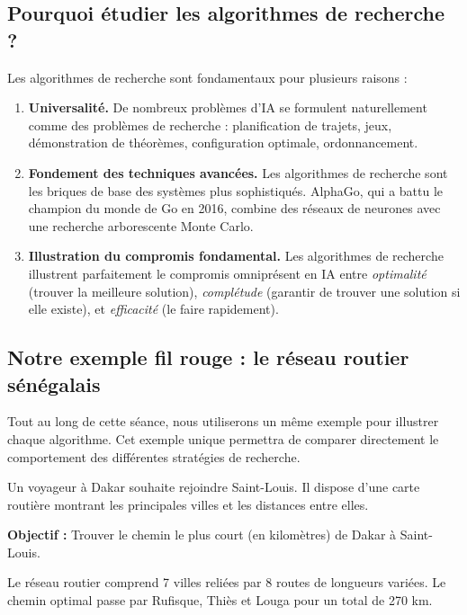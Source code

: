 \documentclass[11pt,a4paper]{article}
\begin{document}
\subsection{Pourquoi étudier les algorithmes de recherche ?}

Les algorithmes de recherche sont fondamentaux pour plusieurs raisons :

\begin{enumerate}
    \item \textbf{Universalité.} De nombreux problèmes d'IA se formulent naturellement comme des problèmes de recherche : planification de trajets, jeux, démonstration de théorèmes, configuration optimale, ordonnancement.
    
    \item \textbf{Fondement des techniques avancées.} Les algorithmes de recherche sont les briques de base des systèmes plus sophistiqués. AlphaGo, qui a battu le champion du monde de Go en 2016, combine des réseaux de neurones avec une recherche arborescente Monte Carlo.
    
    \item \textbf{Illustration du compromis fondamental.} Les algorithmes de recherche illustrent parfaitement le compromis omniprésent en IA entre \textit{optimalité} (trouver la meilleure solution), \textit{complétude} (garantir de trouver une solution si elle existe), et \textit{efficacité} (le faire rapidement).
\end{enumerate}

\subsection{Notre exemple fil rouge : le réseau routier sénégalais}

Tout au long de cette séance, nous utiliserons un même exemple pour illustrer chaque algorithme. Cet exemple unique permettra de comparer directement le comportement des différentes stratégies de recherche.

\begin{exemplebox}
Un voyageur à Dakar souhaite rejoindre Saint-Louis. Il dispose d'une carte routière montrant les principales villes et les distances entre elles.

\textbf{Objectif :} Trouver le chemin le plus court (en kilomètres) de Dakar à Saint-Louis.

Le réseau routier comprend 7 villes reliées par 8 routes de longueurs variées. Le chemin optimal passe par Rufisque, Thiès et Louga pour un total de 270 km.
\end{exemplebox}
\end{document}
